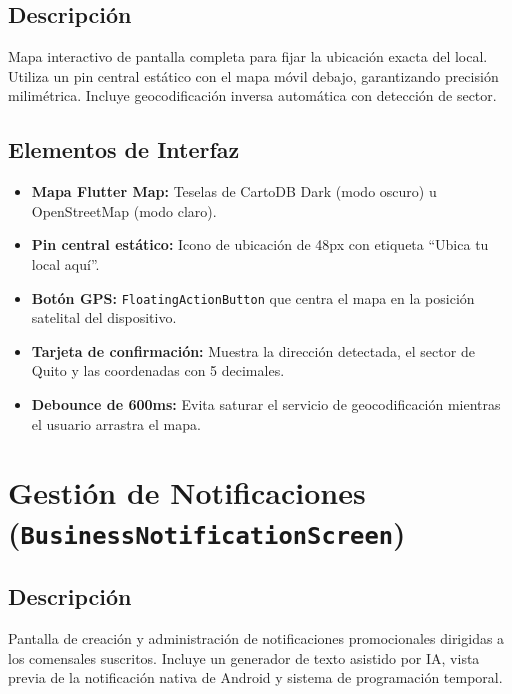 \documentclass[11pt, a4paper, oneside]{report}
\begin{document}
\subsection{Descripción}
Mapa interactivo de pantalla completa para fijar la ubicación exacta del local. Utiliza un pin central estático con el mapa móvil debajo, garantizando precisión milimétrica. Incluye geocodificación inversa automática con detección de sector.

\subsection{Elementos de Interfaz}
\begin{itemize}
  \item \textbf{Mapa Flutter Map:} Teselas de CartoDB Dark (modo oscuro) u OpenStreetMap (modo claro).
  \item \textbf{Pin central estático:} Icono de ubicación de 48px con etiqueta ``Ubica tu local aquí''.
  \item \textbf{Botón GPS:} \texttt{FloatingActionButton} que centra el mapa en la posición satelital del dispositivo.
  \item \textbf{Tarjeta de confirmación:} Muestra la dirección detectada, el sector de Quito y las coordenadas con 5 decimales.
  \item \textbf{Debounce de 600ms:} Evita saturar el servicio de geocodificación mientras el usuario arrastra el mapa.
\end{itemize}

\section{Gestión de Notificaciones (\texttt{BusinessNotificationScreen})}

\subsection{Descripción}
Pantalla de creación y administración de notificaciones promocionales dirigidas a los comensales suscritos. Incluye un generador de texto asistido por IA, vista previa de la notificación nativa de Android y sistema de programación temporal.
\end{document}
